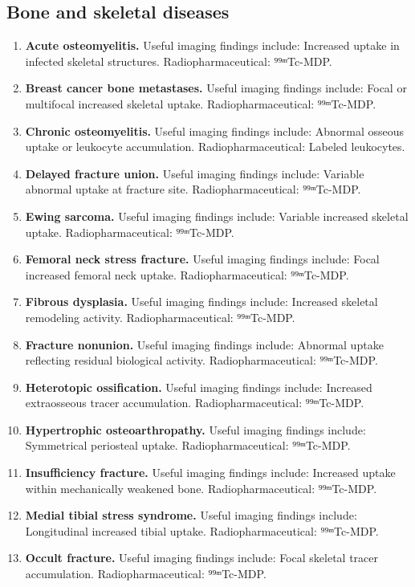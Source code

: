 \subsection{Bone and skeletal diseases}
\begin{enumerate}[leftmargin=*,itemsep=0.45em,topsep=0.4em]
\item \textbf{Acute osteomyelitis.} Useful imaging findings include: Increased uptake in infected skeletal structures. Radiopharmaceutical: ⁹⁹ᵐTc-MDP.
\item \textbf{Breast cancer bone metastases.} Useful imaging findings include: Focal or multifocal increased skeletal uptake. Radiopharmaceutical: ⁹⁹ᵐTc-MDP.
\item \textbf{Chronic osteomyelitis.} Useful imaging findings include: Abnormal osseous uptake or leukocyte accumulation. Radiopharmaceutical: Labeled leukocytes.
\item \textbf{Delayed fracture union.} Useful imaging findings include: Variable abnormal uptake at fracture site. Radiopharmaceutical: ⁹⁹ᵐTc-MDP.
\item \textbf{Ewing sarcoma.} Useful imaging findings include: Variable increased skeletal uptake. Radiopharmaceutical: ⁹⁹ᵐTc-MDP.
\item \textbf{Femoral neck stress fracture.} Useful imaging findings include: Focal increased femoral neck uptake. Radiopharmaceutical: ⁹⁹ᵐTc-MDP.
\item \textbf{Fibrous dysplasia.} Useful imaging findings include: Increased skeletal remodeling activity. Radiopharmaceutical: ⁹⁹ᵐTc-MDP.
\item \textbf{Fracture nonunion.} Useful imaging findings include: Abnormal uptake reflecting residual biological activity. Radiopharmaceutical: ⁹⁹ᵐTc-MDP.
\item \textbf{Heterotopic ossification.} Useful imaging findings include: Increased extraosseous tracer accumulation. Radiopharmaceutical: ⁹⁹ᵐTc-MDP.
\item \textbf{Hypertrophic osteoarthropathy.} Useful imaging findings include: Symmetrical periosteal uptake. Radiopharmaceutical: ⁹⁹ᵐTc-MDP.
\item \textbf{Insufficiency fracture.} Useful imaging findings include: Increased uptake within mechanically weakened bone. Radiopharmaceutical: ⁹⁹ᵐTc-MDP.
\item \textbf{Medial tibial stress syndrome.} Useful imaging findings include: Longitudinal increased tibial uptake. Radiopharmaceutical: ⁹⁹ᵐTc-MDP.
\item \textbf{Occult fracture.} Useful imaging findings include: Focal skeletal tracer accumulation. Radiopharmaceutical: ⁹⁹ᵐTc-MDP.

\end{enumerate}
